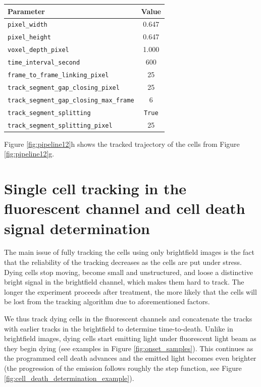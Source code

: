 \documentclass[pdftex,12pt,a4paper]{report}
\begin{document}
\begin{table}[H]
\centering
\begin{tabular}[t]{ l | c }
\hline
Parameter & Value \\
\hline\hline
\texttt{pixel\_width} & 0.647 \\
\texttt{pixel\_height} & 0.647 \\
\texttt{voxel\_depth\_pixel} & 1.000 \\
\texttt{time\_interval\_second} & 600\\
\texttt{frame\_to\_frame\_linking\_pixel} & 25 \\
\texttt{track\_segment\_gap\_closing\_pixel} & 25 \\
\texttt{track\_segment\_gap\_closing\_max\_frame} & 6 \\
\texttt{track\_segment\_splitting} & \texttt{True} \\
\texttt{track\_segment\_splitting\_pixel} & 25 \\
\hline
\end{tabular}
\end{table}


Figure \ref{fig:pipeline12}h shows the tracked trajectory of the cells from Figure \ref{fig:pipeline12}g.

\section{Single cell tracking in the fluorescent channel and cell death signal determination}
\label{section:pipeline_fluoroscent}

The main issue of fully tracking the cells using only brightfield images is the fact that the reliability of the tracking decreases as the cells are put under stress. Dying cells stop moving, become small and unstructured, and loose a distinctive bright signal in the brightfield channel, which makes them hard to track. The longer the experiment proceeds after treatment, the more likely that the cells will be lost from the tracking algorithm due to aforementioned factors.

We thus track dying cells in the fluorescent channels and concatenate the tracks with earlier tracks in the brightfield to determine time-to-death. Unlike in brightfield images, dying cells start emitting light under fluorescent light beam as they begin dying (see examples in Figure \ref{fig:onset_samples}). This continues as the programmed cell death advances and the emitted light becomes even brighter (the progression of the emission follows roughly the step function, see Figure \ref{fig:cell_death_determination_example}).
\end{document}

